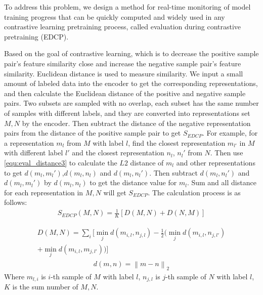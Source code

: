 \documentclass[conference]{IEEEtran}
\begin{document}
To address this problem, we design a method for real-time monitoring of model training progress that can be quickly computed and widely used in any contrastive learning pretraining process, called evaluation during contrastive pretraining (EDCP). 

Based on the goal of contrastive learning, which is to decrease the positive sample pair's feature similarity close and increase the negative sample pair's feature similarity. Euclidean distance is used to measure similarity. We input a small amount of labeled data into the encoder to get the corresponding representations, and then calculate the Euclidean distance of the positive and negative sample pairs.
Two subsets are sampled with no overlap, each subset has the same number of samples with different labels, and they are converted into representations set $M, N$ by the encoder. Then subtract the distance of the negative representation pairs from the distance of the positive sample pair to get $S_{EDCP}$.
 For example, for a representation $m_{l}$ from $M$ with label $l$, find the closest representation $m_{l'}$ in $M$ with different label $l'$ and the closest representation $n_l$, $n_l'$ from $N$. Then use \eqref{equ:eval_distance3} to calculate the $L2$ distance of $m_{l}$ and other representations to get $d(m_{l},m_l')$,$d(m_{l},n_l)$ and $d(m_{l},n_l')$. Then subtract $d(m_{l},n_l')$ and $d(m_{l},m_l')$ by $d(m_{l},n_l)$ to get the distance value for $m_{l}$. Sum and all distance for each representation in ${M,N}$ will get $S_{EDCP}$. The calculation process is as follows:
\begin{equation}
\begin{aligned}
\label{equ:eval_distance1}
S_{EDCP}(M,N)=\frac{1}{K}[D(M,N)+D(N,M)]
\end{aligned}
\end{equation}

\begin{equation}
\label{equ:eval_distance2}
\begin{aligned}
D(M,N)=\sum_{i}[\min_{j}d( m_{i,l},n_{j,l} )  -\frac{1}{2}(\min_{j}d( m_{i,l},n_{j,l'} )\\+\min_{j}d(m_{i,l},m_{j,l'}))] 
\end{aligned}
\end{equation}
\begin{equation}
\label{equ:eval_distance3}
\begin{aligned}
d(m,n)=\left \| m-n \right \|_2
\end{aligned}
\end{equation}
Where $m_{l, i}$ is $i$-th sample of $M$ with label $l$, $n_{j,l}$ is $j$-th sample of $N$ with label $l$, $K$ is the sum number of ${M, N}$.
\end{document}
